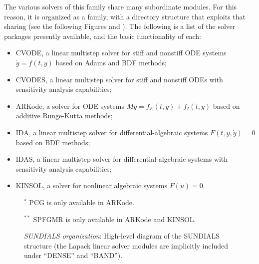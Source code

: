 \documentclass[letterpaper,10pt,english]{sphinxmanual}
\begin{document}
The various solvers of this family share many subordinate modules.
For this reason, it is organized as a family, with a directory
structure that exploits that sharing (see the following Figures
{\hyperref[Organization:sunorg1]{\emph{}}} and {\hyperref[Organization:sunorg2]{\emph{}}}).  The following is a list of the solver packages presently
available, and the basic functionality of each:
\begin{itemize}
\item {} 
CVODE, a linear multistep solver for stiff and nonstiff ODE systems
\(\dot{y} = f(t,y)\) based on Adams and BDF methods;

\item {} 
CVODES, a linear multistep solver for stiff and nonstiff ODEs with
sensitivity analysis capabilities;

\item {} 
ARKode, a solver for ODE systems \(M \dot{y} = f_E(t,y) + f_I(t,y)\)
based on additive Runge-Kutta methods;

\item {} 
IDA, a linear multistep solver for differential-algebraic systems
\(F(t,y,\dot{y}) = 0\) based on BDF methods;

\item {} 
IDAS, a linear multistep solver for differential-algebraic systems with sensitivity
analysis capabilities;

\item {} 
KINSOL, a solver for nonlinear algebraic systems \(F(u) = 0\).

\end{itemize}
\begin{figure}[htbp]
\centering
\capstart

\caption{\emph{SUNDIALS organization}: High-level diagram of the SUNDIALS structure (the
Lapack linear solver modules are implicitly included under ``DENSE''
and ``BAND'').}{\small 
\(^*\) PCG is only available in ARKode.

\(^{**}\) SPFGMR is only available in ARKode and KINSOL.
}\label{Organization:sunorg1}\end{figure}
\end{document}
